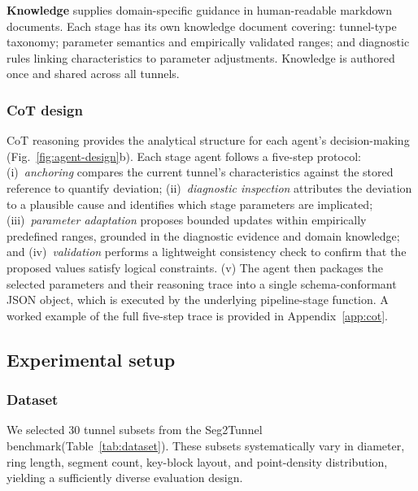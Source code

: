 \documentclass[a4paper,fleqn]{cas-dc}
\begin{document}
\textbf{Knowledge} supplies domain-specific guidance in human-readable markdown documents. Each stage has its own knowledge document covering: tunnel-type taxonomy; parameter semantics and empirically validated ranges; and diagnostic rules linking characteristics to parameter adjustments. Knowledge is authored once and shared across all tunnels.

\subsubsection{CoT design}\label{sec:cot}

CoT reasoning provides the analytical structure for each agent's decision-making (Fig.~\ref{fig:agent-design}b). Each stage agent follows a five-step protocol: (i)~\emph{anchoring} compares the current tunnel's characteristics against the stored reference to quantify deviation; (ii)~\emph{diagnostic inspection} attributes the deviation to a plausible cause and identifies which stage parameters are implicated; (iii)~\emph{parameter adaptation} proposes bounded updates within empirically predefined ranges, grounded in the diagnostic evidence and domain knowledge; and (iv)~\emph{validation} performs a lightweight consistency check to confirm that the proposed values satisfy logical constraints. (v) The agent then packages the selected parameters and their reasoning trace into a single schema-conformant JSON object, which is executed by the underlying pipeline-stage function. A worked example of the full five-step trace is provided in Appendix~\ref{app:cot}.

\subsection{Experimental setup}\label{sec:exp-setup}

\subsubsection{Dataset}\label{sec:dataset}

We selected 30 tunnel subsets from the Seg2Tunnel benchmark(Table~\ref{tab:dataset}). These subsets systematically vary in diameter, ring length, segment count, key-block layout, and point-density distribution, yielding a sufficiently diverse evaluation design. 
\end{document}
